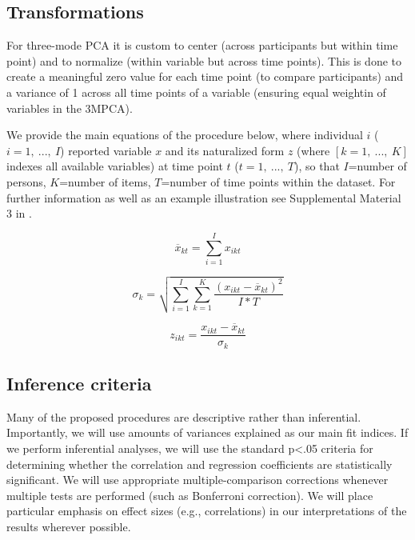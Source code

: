 \documentclass[]{article}
\begin{document}
\hypertarget{transformations}{%
\subsection{Transformations}\label{transformations}}

\setlength{\abovedisplayskip}{0pt}
\setlength{\belowdisplayskip}{0pt}
\setlength{\abovedisplayshortskip}{0pt}
\setlength{\belowdisplayshortskip}{0pt}

For three-mode PCA it is custom to center (across participants but
within time point) and to normalize (within variable but across time
points). This is done to create a meaningful zero value for each time
point (to compare participants) and a variance of 1 across all time
points of a variable (ensuring equal weightin of variables in the
3MPCA).

We provide the main equations of the procedure below, where individual
\(i\) (\(i = 1,\ ...,\ I\)) reported variable \(x\) and its naturalized
form \(z\) (where \([k = 1,\ ...,\ K]\) indexes all available variables)
at time point \(t\) (\(t = 1,\ ...,\ T\)), so that \(I\)=number of
persons, \(K\)=number of items, \(T\)=number of time points within the
dataset. For further information as well as an example illustration see
Supplemental Material 3 in \citet{Monden2015}.

\begin{equation} \label{eq:Mean}
  \overline{x}_{kt} =  \sum_{i=1}^I x_{ikt}
\end{equation}

\begin{equation} \label{eq:NormalizationSd}
  \sigma_{k} =  \sqrt{\sum_{i=1}^I \sum_{k=1}^K \frac{(x_{ikt}-\overline{x}_{kt})^2}{I*T}}
\end{equation}

\begin{equation} \label{eq:NormalizedScore}
  z_{ikt} =  \frac{x_{ikt}-\overline{x}_{kt}}{\sigma_{k}}
\end{equation}

\hypertarget{inference-criteria}{%
\subsection{Inference criteria}\label{inference-criteria}}

Many of the proposed procedures are descriptive rather than inferential.
Importantly, we will use amounts of variances explained as our main fit
indices. If we perform inferential analyses, we will use the standard
p\textless.05 criteria for determining whether the correlation and
regression coefficients are statistically significant. We will use
appropriate multiple-comparison corrections whenever multiple tests are
performed (such as Bonferroni correction). We will place particular
emphasis on effect sizes (e.g., correlations) in our interpretations of
the results wherever possible.
\end{document}
